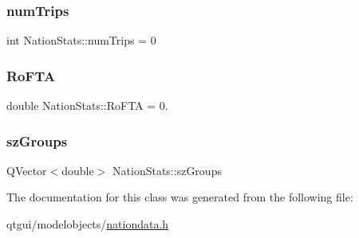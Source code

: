 \mbox{\label{class_nation_stats_a6a49e465cf0ffb61ff4f96f5cf6f39c0}} 
\subsubsection{\texorpdfstring{numTrips}{numTrips}}
{\footnotesize\ttfamily int Nation\+Stats\+::num\+Trips = 0}

\mbox{\label{class_nation_stats_ae2616bbc89d8bd67522144553c078f16}} 
\subsubsection{\texorpdfstring{RoFTA}{RoFTA}}
{\footnotesize\ttfamily double Nation\+Stats\+::\+Ro\+F\+TA = 0.}

\mbox{\label{class_nation_stats_a20bb21b8af4cb890bbb47268b5d0fe5f}} 
\subsubsection{\texorpdfstring{szGroups}{szGroups}}
{\footnotesize\ttfamily Q\+Vector$<$double$>$ Nation\+Stats\+::sz\+Groups}



The documentation for this class was generated from the following file\+:\begin{DoxyCompactItemize}
\item 
qtgui/modelobjects/\mbox{\hyperlink{nationdata_8h}{nationdata.\+h}}\end{DoxyCompactItemize}
